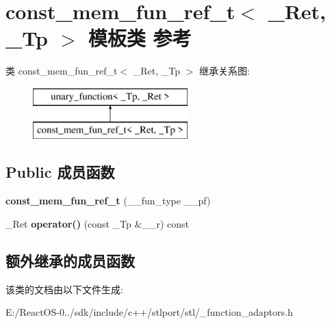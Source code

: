 \hypertarget{classconst__mem__fun__ref__t}{}\section{const\+\_\+mem\+\_\+fun\+\_\+ref\+\_\+t$<$ \+\_\+\+Ret, \+\_\+\+Tp $>$ 模板类 参考}
\label{classconst__mem__fun__ref__t}
类 const\+\_\+mem\+\_\+fun\+\_\+ref\+\_\+t$<$ \+\_\+\+Ret, \+\_\+\+Tp $>$ 继承关系图\+:\begin{figure}[H]
\begin{center}
\leavevmode
\includegraphics[height=2.000000cm]{classconst__mem__fun__ref__t}
\end{center}
\end{figure}
\subsection*{Public 成员函数}
\begin{DoxyCompactItemize}
\item 
\mbox{\label{classconst__mem__fun__ref__t_a57ef8376d79f42c20384893652f8cf62}} 
{\bfseries const\+\_\+mem\+\_\+fun\+\_\+ref\+\_\+t} (\+\_\+\+\_\+fun\+\_\+type \+\_\+\+\_\+pf)
\item 
\mbox{\label{classconst__mem__fun__ref__t_a4de923f8e250f8d4fc69296cc58687c4}} 
\+\_\+\+Ret {\bfseries operator()} (const \+\_\+\+Tp \&\+\_\+\+\_\+r) const
\end{DoxyCompactItemize}
\subsection*{额外继承的成员函数}


该类的文档由以下文件生成\+:\begin{DoxyCompactItemize}
\item 
E\+:/\+React\+O\+S-\/0../sdk/include/c++/stlport/stl/\+\_\+function\+\_\+adaptors.\+h\end{DoxyCompactItemize}
